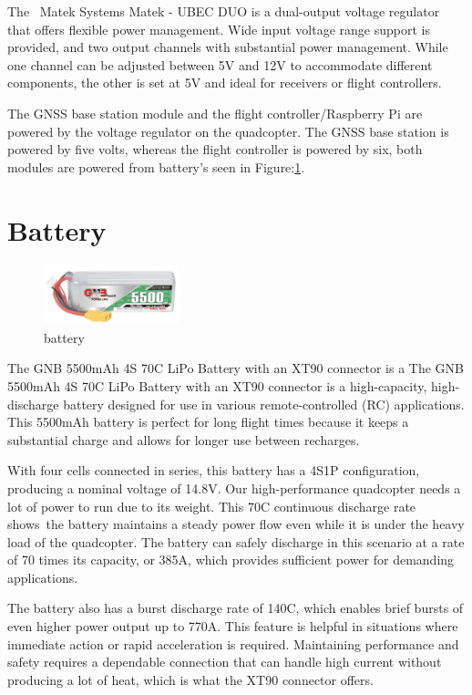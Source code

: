 \documentclass{report}
\begin{document}
The  Matek Systems Matek - UBEC DUO is a dual-output voltage regulator that
offers flexible power management. Wide input voltage range support is provided,
and two output channels with substantial power management. While one channel can
be adjusted between 5V and 12V to accommodate different components, the other is
set at 5V and ideal for receivers or flight controllers.

The GNSS base station module and the flight controller/Raspberry Pi are powered
by the voltage regulator on the quadcopter. The GNSS base station is powered by
five volts, whereas the flight controller is powered by six, both modules are
powered from battery's seen in Figure:\ref{battery}.

\section{Battery}\label{battery}
\begin{figure}[H]
  \centering
  \includegraphics[width=0.35\textwidth]{Pictures/battery.png}
  \caption{battery}
  \label{fig:battery}
\end{figure}
The GNB 5500mAh 4S 70C LiPo Battery with an XT90 connector is a The GNB 5500mAh
4S 70C LiPo Battery with an XT90 connector is a high-capacity, high-discharge
battery designed for use in various remote-controlled (RC) applications. This
5500mAh battery is perfect for long flight times because it keeps a substantial
charge and allows for longer use between recharges.

With four cells connected in series, this battery has a 4S1P configuration,
producing a nominal voltage of 14.8V. Our high-performance quadcopter needs a
lot of power to run due to its weight. This 70C continuous discharge rate
shows the battery maintains a steady power flow even while it is under the heavy
load of the quadcopter. The battery can safely discharge in this scenario at a
rate of 70 times its capacity, or 385A, which provides sufficient power for
demanding applications.

The battery also has a burst discharge rate of 140C, which enables brief bursts
of even higher power output up to 770A. This feature is helpful in situations
where immediate action or rapid acceleration is required. Maintaining
performance and safety requires a dependable connection that can handle high
current without producing a lot of heat, which is what the XT90 connector
offers.
\end{document}
